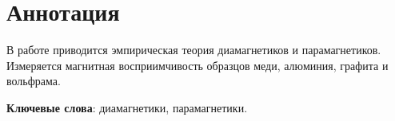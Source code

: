 \section*{Аннотация}

В работе приводится эмпирическая теория диамагнетиков и парамагнетиков. Измеряется магнитная восприимчивость образцов меди, алюминия, графита и вольфрама.

\vspace{10pt}
\noindent\textbf{Ключевые слова}: диамагнетики, парамагнетики.